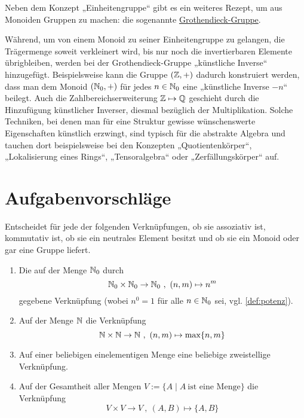 \begin{vorschau}
    Neben dem Konzept „Einheitengruppe“ gibt es ein weiteres Rezept, um aus Monoiden Gruppen zu machen: die sogenannte \href{https://de.wikipedia.org/wiki/Grothendieck-Gruppe}{Grothendieck-Gruppe}.
    
    Während, um von einem Monoid zu seiner Einheitengruppe zu gelangen, die Trägermenge soweit verkleinert wird, bis nur noch die invertierbaren Elemente übrigbleiben, werden bei der Grothendieck-Gruppe „künstliche Inverse“ hinzugefügt. Beispielsweise kann die Gruppe $(\mathbb Z,+)$ dadurch konstruiert werden, dass man dem Monoid $(\mathbb N_0,+)$ für jedes $n\in \mathbb N_0$ eine „künstliche Inverse $-n$“ beilegt. Auch die Zahlbereichserweiterung $\mathbb Z \mapsto \mathbb Q$ geschieht durch die Hinzufügung künstlicher Inverser, diesmal bezüglich der Multiplikation. Solche Techniken, bei denen man für eine Struktur gewisse wünschenswerte Eigenschaften künstlich erzwingt, sind typisch für die abstrakte Algebra und tauchen dort beispielsweise bei den Konzepten „Quotientenkörper“, „Lokalisierung eines Rings“, „Tensoralgebra“ oder „Zerfällungskörper“ auf.
\end{vorschau}





\clearpage
\section{Aufgabenvorschläge}


\begin{aufg} \label{aufg:verknuepfungen}
    Entscheidet für jede der folgenden Verknüpfungen, ob sie assoziativ ist, kommutativ ist, ob sie ein neutrales Element besitzt und ob sie ein Monoid oder gar eine Gruppe liefert.
    \begin{enumerate}
        \item Die auf der Menge $\mathbb N_0$ durch
            \[ \mathbb N_0 \times \mathbb N_0 \to \mathbb N_0 \ ,\ (n,m) \mapsto n^m \]
        gegebene Verknüpfung (wobei $n^0=1$ für alle $n\in \mathbb N_0$ sei, vgl. \cref{def:potenz}).
        \item Auf der Menge $\mathbb N$ die Verknüpfung
            \[ \mathbb N \times \mathbb N \to \mathbb N \ ,\ (n,m) \mapsto \max \{n,m\} \]
        \item Auf einer beliebigen einelementigen Menge eine beliebige zweistellige Verknüpfung.
        \item Auf der Gesamtheit aller Mengen $V:=\{A\mid A\ \text{ist eine Menge}\}$ die Verknüpfung
            \[ V\times V\to V \ ,\ (A,B) \mapsto \{A,B\} \]
    \end{enumerate}
\end{aufg}


